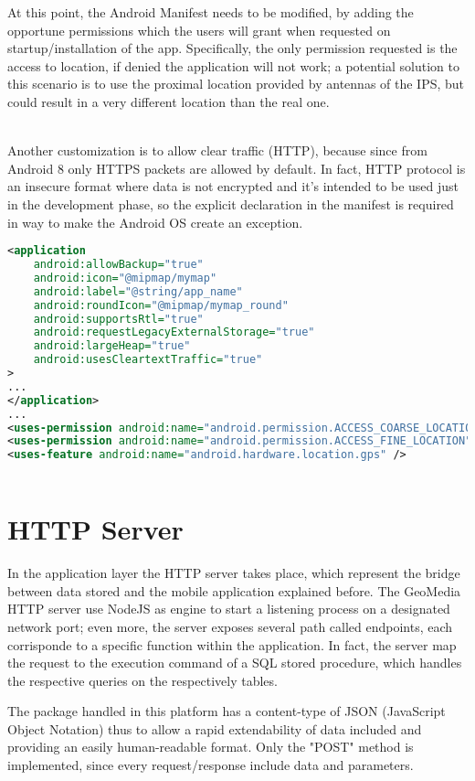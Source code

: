 \documentclass[conference]{IEEEtran}
\begin{document}
At this point, the Android Manifest needs to be modified, by adding the opportune permissions which the users will grant when requested on startup/installation of the app.
Specifically, the only permission requested is the access to location, if denied the application will not work; a potential solution to this scenario is to use the proximal location provided by antennas of the IPS, but could result in a very different location than the real one.

\\
Another customization is to allow clear traffic (HTTP), because since from Android 8 only HTTPS packets are allowed by default.
In fact, HTTP protocol is an insecure format where data is not encrypted and it's intended to be used just in the development phase, so the explicit declaration in the manifest is required in way to make the Android OS create an exception.

\begin{lstlisting}[language=XML, caption=Snippet of Android Manifest]
<application
    android:allowBackup="true"
    android:icon="@mipmap/mymap"
    android:label="@string/app_name"
    android:roundIcon="@mipmap/mymap_round"
    android:supportsRtl="true"
    android:requestLegacyExternalStorage="true"
    android:largeHeap="true"
    android:usesCleartextTraffic="true"
>
...
</application>
...
<uses-permission android:name="android.permission.ACCESS_COARSE_LOCATION" />
<uses-permission android:name="android.permission.ACCESS_FINE_LOCATION" />
<uses-feature android:name="android.hardware.location.gps" />
        
\end{lstlisting}

\section{HTTP Server}

In the application layer the HTTP server takes place, which represent the bridge between data stored and the mobile application explained before.
The GeoMedia HTTP server use NodeJS\cite{b4} as engine to start a listening process on a designated network port; even more, the server exposes several path called endpoints, each corrisponde to a specific function within the application. In fact, the server map the request to the execution command of a SQL stored procedure, which handles the respective queries on the respectively tables.

The package handled in this platform has a content-type of JSON (JavaScript Object Notation) thus to allow a rapid extendability of data included and providing an easily human-readable format.
Only the "POST" method is implemented, since every request/response include data and parameters.
\end{document}
